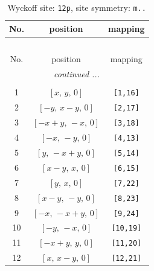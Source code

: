 \documentclass[fleqn,8pt]{jsarticle}
\begin{document}
\begin{longtable}{ccc}
\caption{Wyckoff site: {\tt 12p}, site symmetry: {\tt m..}}
 \\
 \hline \hline
No. & position & mapping \\ \hline \endfirsthead

\multicolumn{2}{l}{\tablename\ \thetable{}} \\
 \hline \hline
No. & position & mapping \\ \hline \endhead

 \hline \hline
\multicolumn{2}{r}{\footnotesize\it continued ...} \\ \endfoot

 \hline \hline
\multicolumn{2}{r}{} \\ \endlastfoot

1 & $\left[ x,\, y,\, 0 \right]$ & {\tt [1,16]} \\ \hline
2 & $\left[ - y,\, x - y,\, 0 \right]$ & {\tt [2,17]} \\ \hline
3 & $\left[ - x + y,\, - x,\, 0 \right]$ & {\tt [3,18]} \\ \hline
4 & $\left[ - x,\, - y,\, 0 \right]$ & {\tt [4,13]} \\ \hline
5 & $\left[ y,\, - x + y,\, 0 \right]$ & {\tt [5,14]} \\ \hline
6 & $\left[ x - y,\, x,\, 0 \right]$ & {\tt [6,15]} \\ \hline
7 & $\left[ y,\, x,\, 0 \right]$ & {\tt [7,22]} \\ \hline
8 & $\left[ x - y,\, - y,\, 0 \right]$ & {\tt [8,23]} \\ \hline
9 & $\left[ - x,\, - x + y,\, 0 \right]$ & {\tt [9,24]} \\ \hline
10 & $\left[ - y,\, - x,\, 0 \right]$ & {\tt [10,19]} \\ \hline
11 & $\left[ - x + y,\, y,\, 0 \right]$ & {\tt [11,20]} \\ \hline
12 & $\left[ x,\, x - y,\, 0 \right]$ & {\tt [12,21]} \\
\end{longtable}
\renewcommand{\arraystretch}{1.2}
\end{document}
